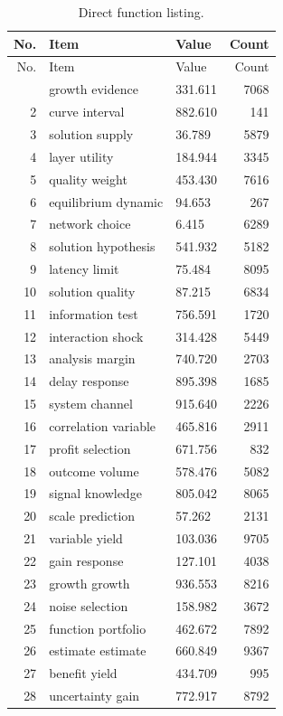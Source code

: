 \documentclass[11pt]{report}
\begin{document}
\begin{longtable}{rllr}\caption{Direct function listing.}\label{tab:l3}\\\toprule No. & Item & Value & Count \\ \midrule \endfirsthead\toprule No. & Item & Value & Count \\ \midrule \endhead\bottomrule \endfoot
1 & growth evidence & 331.611 & 7068 \\
2 & curve interval & 882.610 & 141 \\
3 & solution supply & 36.789 & 5879 \\
4 & layer utility & 184.944 & 3345 \\
5 & quality weight & 453.430 & 7616 \\
6 & equilibrium dynamic & 94.653 & 267 \\
7 & network choice & 6.415 & 6289 \\
8 & solution hypothesis & 541.932 & 5182 \\
9 & latency limit & 75.484 & 8095 \\
10 & solution quality & 87.215 & 6834 \\
11 & information test & 756.591 & 1720 \\
12 & interaction shock & 314.428 & 5449 \\
13 & analysis margin & 740.720 & 2703 \\
14 & delay response & 895.398 & 1685 \\
15 & system channel & 915.640 & 2226 \\
16 & correlation variable & 465.816 & 2911 \\
17 & profit selection & 671.756 & 832 \\
18 & outcome volume & 578.476 & 5082 \\
19 & signal knowledge & 805.042 & 8065 \\
20 & scale prediction & 57.262 & 2131 \\
21 & variable yield & 103.036 & 9705 \\
22 & gain response & 127.101 & 4038 \\
23 & growth growth & 936.553 & 8216 \\
24 & noise selection & 158.982 & 3672 \\
25 & function portfolio & 462.672 & 7892 \\
26 & estimate estimate & 660.849 & 9367 \\
27 & benefit yield & 434.709 & 995 \\
28 & uncertainty gain & 772.917 & 8792 \\

\end{longtable}
\end{document}

